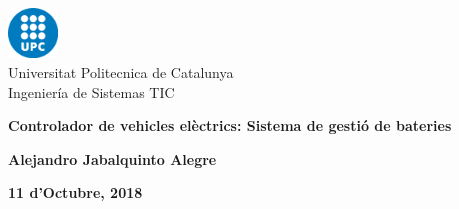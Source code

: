 \begin{titlepage}
    \begin{center}
        \vspace*{1cm}
        
        \includegraphics[width=0.1\textwidth]{upc}\\
        Universitat Politecnica de Catalunya\\
        Ingeniería de Sistemas TIC\\
        
        \vspace{2cm}
        
        {\Large \textbf{Controlador de vehicles elèctrics: Sistema de gestió de bateries}}
        
        \vspace{1.5cm}
        
        \textbf{Alejandro Jabalquinto Alegre}
        
        \vfill
        
        \textbf{11 d'Octubre, 2018}
    \end{center}
\end{titlepage}